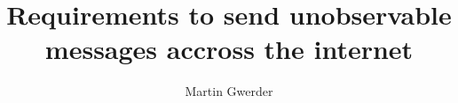 \documentclass[12pt,journal,compsoc]{IEEEtran}
\begin{document}
%
\title{Requirements to send unobservable messages accross the internet}
%
%
%
%

\ifCLASSOPTIONpeerreview
\author{}
\else
\author{Martin Gwerder%
}
\fi

% 
%
\end{document}
